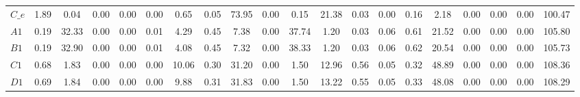 \begin{center}
\begin{longtable}{lccccccccccccccccccc}
$C\_e                       $	 & 	                1.89	 & 	                0.04	 & 	                0.00	 & 	                0.00	 & 	                0.00	 & 	                0.65	 & 	                0.05	 & 	               73.95	 & 	                0.00	 & 	                0.15	 & 	               21.38	 & 	                0.03	 & 	                0.00	 & 	                0.16	 & 	                2.18	 & 	                0.00	 & 	                0.00	 & 	                0.00	 & 	              100.47 \\ 
$A1                         $	 & 	                0.19	 & 	               32.33	 & 	                0.00	 & 	                0.00	 & 	                0.01	 & 	                4.29	 & 	                0.45	 & 	                7.38	 & 	                0.00	 & 	               37.74	 & 	                1.20	 & 	                0.03	 & 	                0.06	 & 	                0.61	 & 	               21.52	 & 	                0.00	 & 	                0.00	 & 	                0.00	 & 	              105.80 \\ 
$B1                         $	 & 	                0.19	 & 	               32.90	 & 	                0.00	 & 	                0.00	 & 	                0.01	 & 	                4.08	 & 	                0.45	 & 	                7.32	 & 	                0.00	 & 	               38.33	 & 	                1.20	 & 	                0.03	 & 	                0.06	 & 	                0.62	 & 	               20.54	 & 	                0.00	 & 	                0.00	 & 	                0.00	 & 	              105.73 \\ 
$C1                         $	 & 	                0.68	 & 	                1.83	 & 	                0.00	 & 	                0.00	 & 	                0.00	 & 	               10.06	 & 	                0.30	 & 	               31.20	 & 	                0.00	 & 	                1.50	 & 	               12.96	 & 	                0.56	 & 	                0.05	 & 	                0.32	 & 	               48.89	 & 	                0.00	 & 	                0.00	 & 	                0.00	 & 	              108.36 \\ 
$D1                         $	 & 	                0.69	 & 	                1.84	 & 	                0.00	 & 	                0.00	 & 	                0.00	 & 	                9.88	 & 	                0.31	 & 	               31.83	 & 	                0.00	 & 	                1.50	 & 	               13.22	 & 	                0.55	 & 	                0.05	 & 	                0.33	 & 	               48.08	 & 	                0.00	 & 	                0.00	 & 	                0.00	 & 	              108.29 \\ 

\end{longtable}
\end{center}
